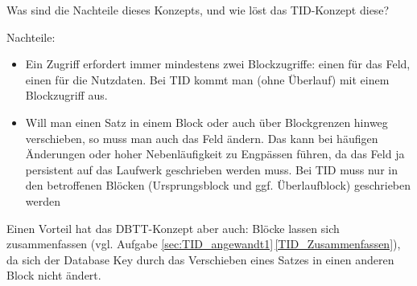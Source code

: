 \begin{enumerate}[a)]
	Was sind die Nachteile dieses Konzepts, und wie löst das TID-Konzept diese?

	\begin{solution}
	Nachteile:
	\begin{itemize}
		\item Ein Zugriff erfordert immer mindestens zwei Blockzugriffe: einen für das Feld, einen für die Nutzdaten.
		Bei TID kommt man (ohne Überlauf) mit einem Blockzugriff aus.
		\item Will man einen Satz in einem Block oder auch über Blockgrenzen hinweg verschieben, so muss man auch das Feld ändern.
		Das kann bei häufigen Änderungen oder hoher Nebenläufigkeit zu Engpässen führen, da das Feld ja persistent auf das Laufwerk geschrieben werden muss.
		Bei TID muss nur in den betroffenen Blöcken (Ursprungsblock und ggf. Überlaufblock) geschrieben werden
	\end{itemize}
	\end{solution}

	\begin{note}
	  Einen Vorteil hat das DBTT-Konzept aber auch: Blöcke lassen sich zusammenfassen (vgl. Aufgabe \ref{sec:TID_angewandt1}\,\ref{TID_Zusammenfassen}), da sich der Database Key durch das Verschieben eines Satzes in einen anderen Block nicht ändert.
	\end{note}
\end{enumerate}
